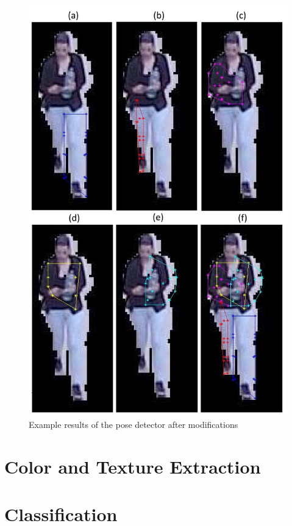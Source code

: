 \documentclass[titlepage,12pt,a4paper,times]{book}
\begin{document}
\begin{figure}[!h]
\centering
\includegraphics[scale=0.63]{images/3_3_fig4_final.jpg}
\caption{Example results of the pose detector after modifications}
\label{fig:erpdm}
\end{figure}
\FloatBarrier

\section{Color and Texture Extraction}
\label{chap3:sec:cte}

\section{Classification}
\label{chap3:sec:ann}
\end{document}
